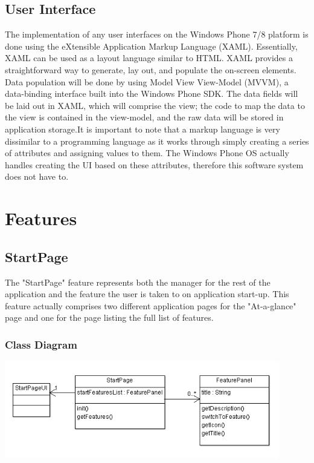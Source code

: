 \documentclass[pdftex,12pt,letter]{article}
\begin{document}
\subsection{User Interface}
The implementation of any user interfaces on the Windows Phone 7/8 platform is done using the eXtensible Application Markup Language (XAML). Essentially, XAML can be used as a layout language similar to HTML. XAML provides a straightforward way to generate, lay out, and populate the on-screen elements. Data population will be done by using Model View View-Model (MVVM), a data-binding interface built into the Windows Phone SDK. The data fields will be laid out in XAML, which will comprise the view; the code to map the data to the view is contained in the view-model, and the raw data will be stored in application storage.It is important to note that a markup language is very dissimilar to a programming language as it works through simply creating a series of attributes and assigning values to them. The Windows Phone OS actually handles creating the UI based on these attributes, therefore this software system does not have to.
\\
\section{Features}
\subsection{StartPage}
The "StartPage" feature represents both the manager for the rest of the application and the feature the user is taken to on application start-up. This feature actually comprises two different application pages for the "At-a-glance" page and one for the page listing the full list of features.
\subsubsection{Class Diagram}
\includegraphics[width=120mm]{StartPageCD.png}
\end{document}
